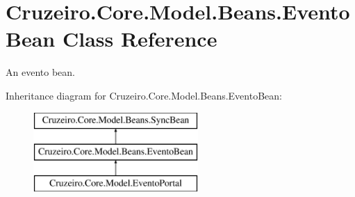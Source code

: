 \hypertarget{class_cruzeiro_1_1_core_1_1_model_1_1_beans_1_1_evento_bean}{}\section{Cruzeiro.\+Core.\+Model.\+Beans.\+Evento\+Bean Class Reference}
\label{class_cruzeiro_1_1_core_1_1_model_1_1_beans_1_1_evento_bean}


An evento bean.  


Inheritance diagram for Cruzeiro.\+Core.\+Model.\+Beans.\+Evento\+Bean\+:\begin{figure}[H]
\begin{center}
\leavevmode
\includegraphics[height=3.000000cm]{class_cruzeiro_1_1_core_1_1_model_1_1_beans_1_1_evento_bean}
\end{center}
\end{figure}

